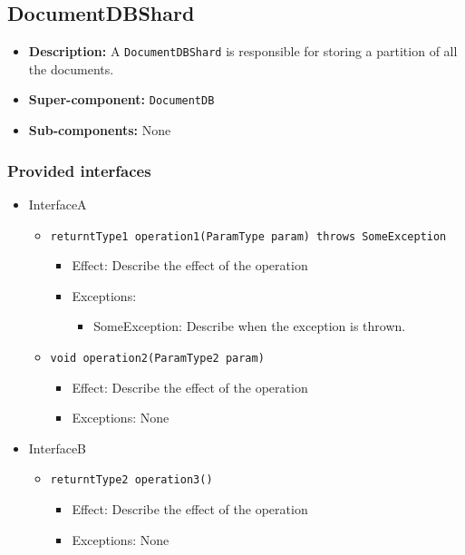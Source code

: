 \documentclass[a4paper,10pt]{article}
\begin{document}
\subsection{DocumentDBShard}
\begin{itemize}
    \item \textbf{Description:} A \texttt{DocumentDBShard} is responsible for storing a partition of all the documents.
    \item \textbf{Super-component:} \texttt{DocumentDB}
    \item \textbf{Sub-components:} None
\end{itemize}

\subsubsection*{Provided interfaces}
\begin{itemize}
    \item InterfaceA
    \begin{itemize}
        \item \texttt{returntType1 operation1(ParamType param) throws SomeException}
        \begin{itemize}
            \item Effect: Describe the effect of the operation
            \item Exceptions:
            \begin{itemize}
                \item SomeException: Describe when the exception is thrown.
            \end{itemize}
		\end{itemize}
        \item \texttt{void operation2(ParamType2 param)}
        \begin{itemize}
            \item Effect: Describe the effect of the operation
            \item Exceptions: None
        \end{itemize}
    \end{itemize}

    \item InterfaceB
    \begin{itemize}
        \item \texttt{returntType2 operation3()}
        \begin{itemize}
            \item Effect: Describe the effect of the operation
            \item Exceptions: None
        \end{itemize}
    \end{itemize}
\end{itemize}
\end{document}
